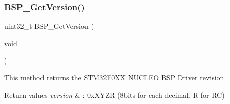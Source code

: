 \subsubsection{\texorpdfstring{B\+S\+P\+\_\+\+Get\+Version()}{BSP\_GetVersion()}}
{\footnotesize\ttfamily uint32\+\_\+t B\+S\+P\+\_\+\+Get\+Version (\begin{DoxyParamCaption}\item[{void}]{ }\end{DoxyParamCaption})}



This method returns the S\+T\+M32\+F0\+XX N\+U\+C\+L\+EO B\+SP Driver revision. 


\begin{DoxyRetVals}{Return values}
{\em version} & \+: 0x\+X\+Y\+ZR (8bits for each decimal, R for RC) \\
\hline
\end{DoxyRetVals}
